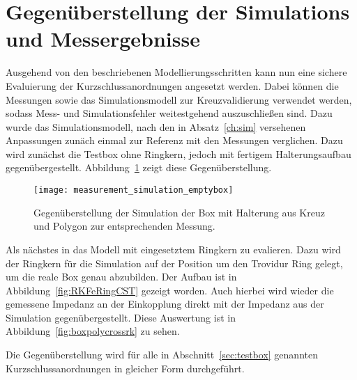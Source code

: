 \section{Gegen\"uberstellung der Simulations und Messergebnisse}
Ausgehend von den beschriebenen Modellierungsschritten kann nun eine sichere Evaluierung der Kurzschlussanordnungen angesetzt werden. Dabei k\"onnen die Messungen sowie das Simulationsmodell zur Kreuzvalidierung verwendet werden, sodass Mess- und Simulationsfehler weitestgehend auszuschlie\ss{}en sind. Dazu wurde das Simulationsmodell, nach den in Absatz~\ref{ch:sim} versehenen Anpassungen zun\"ach einmal zur Referenz mit den Messungen verglichen. Dazu wird zun\"achst die Testbox ohne Ringkern, jedoch mit fertigem Halterungsaufbau gegen\"ubergestellt. Abbildung~\ref{fig:boxpolycross} zeigt diese Gegen\"uberstellung.
\begin{figure}[htb]
	\centering
	\texttt{[image: measurement\_simulation\_emptybox]}
	\caption{Gegen\"uberstellung der Simulation der Box mit Halterung aus Kreuz und Polygon zur entsprechenden Messung.}
	\label{fig:boxpolycross}
\end{figure}
\par
Als n\"achstes in das Modell mit eingesetztem Ringkern zu evalieren. Dazu wird der Ringkern f\"ur die Simulation auf der Position um den Trovidur Ring gelegt, um die reale Box genau abzubilden. Der Aufbau ist in Abbildung~\ref{fig:RKFeRingCST} gezeigt worden. Auch hierbei wird wieder die gemessene Impedanz an der Einkopplung direkt mit der Impedanz aus der Simulation gegen\"ubergestellt. Diese Auswertung ist in Abbildung~\ref{fig:boxpolycrossrk} zu sehen.


\par
Die Gegen\"uberstellung wird f\"ur alle in Abschnitt~\ref{sec:testbox} genannten Kurzschlussanordnungen in gleicher Form durchgef\"uhrt.

